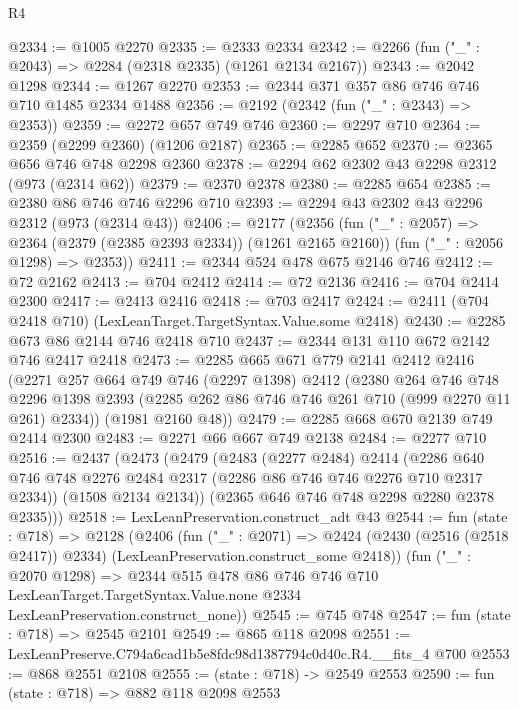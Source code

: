 \begin{lexlean}{R4}
\begin{coremodule}
@2334 := @1005 @2270
@2335 := @2333 @2334
@2342 := @2266 (fun ("_" : @2043) => @2284 (@2318 @2335) (@1261 @2134 @2167))
@2343 := @2042 @1298
@2344 := @1267 @2270
@2353 := @2344 @371 @357 @86 @746 @746 @710 @1485 @2334 @1488
@2356 := @2192 (@2342 (fun ("_" : @2343) => @2353))
@2359 := @2272 @657 @749 @746
@2360 := @2297 @710
@2364 := @2359 (@2299 @2360) (@1206 @2187)
@2365 := @2285 @652
@2370 := @2365 @656 @746 @748 @2298 @2360
@2378 := @2294 @62 @2302 @43 @2298 @2312 (@973 (@2314 @62))
@2379 := @2370 @2378
@2380 := @2285 @654
@2385 := @2380 @86 @746 @746 @2296 @710
@2393 := @2294 @43 @2302 @43 @2296 @2312 (@973 (@2314 @43))
@2406 := @2177
    (@2356
      (fun ("_" : @2057) => @2364 (@2379 (@2385 @2393 @2334)) (@1261 @2165 @2160))
      (fun ("_" : @2056 @1298) => @2353))
@2411 := @2344 @524 @478 @675 @2146 @746
@2412 := @72 @2162
@2413 := @704 @2412
@2414 := @72 @2136
@2416 := @704 @2414 @2300
@2417 := @2413 @2416
@2418 := @703 @2417
@2424 := @2411 (@704 @2418 @710) (LexLeanTarget.TargetSyntax.Value.some @2418)
@2430 := @2285 @673 @86 @2144 @746 @2418 @710
@2437 := @2344 @131 @110 @672 @2142 @746 @2417 @2418
@2473 := @2285
    @665
    @671
    @779
    @2141
    @2412
    @2416
    (@2271
      @257
      @664
      @749
      @746
      (@2297 @1398)
      @2412
      (@2380
        @264
        @746
        @748
        @2296
        @1398
        @2393
        (@2285 @262 @86 @746 @746 @261 @710 (@999 @2270 @11 @261) @2334))
      (@1981 @2160 @48))
@2479 := @2285 @668 @670 @2139 @749 @2414 @2300
@2483 := @2271 @66 @667 @749 @2138
@2484 := @2277 @710
@2516 := @2437
    (@2473
      (@2479
        (@2483
          (@2277 @2484)
          @2414
          (@2286 @640 @746 @748 @2276 @2484 @2317 (@2286 @86 @746 @746 @2276 @710 @2317 @2334))
          (@1508 @2134 @2134))
        (@2365 @646 @746 @748 @2298 @2280 @2378 @2335)))
@2518 := LexLeanPreservation.construct_adt @43
@2544 := fun (state : @718) =>
  @2128
    (@2406
      (fun ("_" : @2071) =>
      @2424 (@2430 (@2516 (@2518 @2417)) @2334) (LexLeanPreservation.construct_some @2418))
      (fun ("_" : @2070 @1298) =>
      @2344
        @515
        @478
        @86
        @746
        @746
        @710
        LexLeanTarget.TargetSyntax.Value.none
        @2334
        LexLeanPreservation.construct_none))
@2545 := @745 @748
@2547 := fun (state : @718) => @2545 @2101
@2549 := @865 @118 @2098
@2551 := LexLeanPreserve.C794a6cad1b5e8fdc98d1387794c0d40c.R4.__fits_4 @700
@2553 := @868 @2551 @2108
@2555 := (state : @718) -> @2549 @2553
@2590 := fun (state : @718) =>
  @882
    @118
    @2098
    @2553

\end{coremodule}
\end{lexlean}
